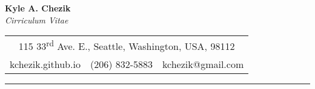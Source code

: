 \documentclass[10pt]{article}
\title{}
\author{}
\date{}
\begin{document}
\begin{spacing}{1}
\thispagestyle{empty}

\begin{center}
{\Large \textbf{Kyle A. Chezik}}\\
\vspace{1.5mm}
{\large \textit{Cirriculum Vitae}}\\

\vspace{4.0mm}

\begin{tabular}{ c c c }
	\multicolumn{3}{c}{115 33\textsuperscript{rd} Ave. E., Seattle, Washington, USA, 98112} \\
	kchezik.github.io & (206) 832-5883 & kchezik@gmail.com \\
\end{tabular}
\end{center}

\hrule



\end{spacing}
\end{document}
